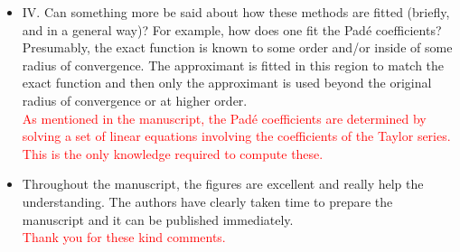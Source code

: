\documentclass[10pt]{letter}
\newcommand{\alert}[1]{\textcolor{red}{#1}}
\begin{document}
\begin{letter}
\begin{itemize}
\item 
	{IV.
	Can something more be said about how these methods are fitted (briefly, and in a general way)? 
	For example, how does one fit the Pad\'e coefficients? 
	Presumably, the exact function is known to some order and/or inside of some radius of convergence. 
	The approximant is fitted in this region to match the exact function and then only the approximant is used beyond the original radius of convergence or at higher order.}
	\\
	\alert{As mentioned in the manuscript, the Pad\'e coefficients are determined by solving a set of linear equations involving the coefficients of the Taylor series.
	This is the  only knowledge required to compute these.}

\item 
	{Throughout the manuscript, the figures are excellent and really help the understanding. 
	The authors have clearly taken time to prepare the manuscript and it can be published immediately.}
	\\
	\alert{Thank you for these kind comments.}
	
\end{itemize}
 
\end{letter}
\end{document}
